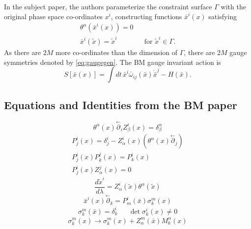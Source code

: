 \documentclass[a4paper,12pt]{article}
\theoremstyle{definition}
\theoremstyle{remark}
\numberwithin{equation}{section}
\newcommand{\al}{\alpha}
\newcommand{\be}{\beta}
\newcommand{\de}{\delta}
\newcommand{\la}{\lambda}
\newcommand{\om}{\omega}
\newcommand{\si}{\sigma}
\newcommand{\To}{\longrightarrow}
\newcommand{\bx}{\bar{x}}
\newcommand{\tx}{\tilde{x}}
\newcommand{\pl}{\overset{\leftarrow}{\partial}}
\begin{document}
In the subject paper, the authors parameterize the constraint
surface $\Gamma$ with the original phase space co-ordinates $x^i$,
constructing functions $\bx^i(x)$ satisfying
\begin{eqnarray}\label{eq:xbar1}
\theta^{\al}(\bx^i(x))=0\label{eq:map1}\\\label{eq:xbar2}
\bx^i(\tx)=\tx^i \label{eq:map2} && \text{for } \tx^i \in \Gamma.
\end{eqnarray}
As there are $2M$ more co-ordinates than the dimension of $\Gamma$,
there are $2M$ gauge symmetries denoted by \eqref{eq:gaugegen}. The
BM gauge invariant action is
\begin{equation}\label{eq:BMaction}
S[\bx(x)]=\int{dt\, \bx^i \bar{\om}_{ij}(\bx) \dot{\bx}^j -
H(\bx)}.
\end{equation}

\subsection{Equations and Identities from the BM paper}
\label{sec:BMidentities}

\begin{equation}\label{eq:Zdef}
\theta^{\al}(x)\pl_i Z^i_{\be}(x)=\delta^{\al}_{\be}
\end{equation}
\begin{eqnarray}
P^i_j(x)=\de^i_j-Z^i_{\al}(x)(\theta^{\al}(x)\pl_j)\label{eq:P}\\
P^i_j(x)P^j_k(x)=P^i_k(x)\\
P^i_j(x)Z^j_{\al}(x)=0 \label{eq:PZ}
\end{eqnarray}
\begin{equation}\label{eq:xtilda}
\frac{d\tx^i}{d\la}=Z^i_{\al}(\tx)\theta^{\al}(\tx)
\end{equation}
\begin{equation}\label{eq:dxbar}
\bx^i(x)\pl_k=P^i_m(\bx)\sigma^m_k(x)
\end{equation}
\begin{eqnarray}
\si^m_k(\bx)=\de^i_k && \det \si^i_k(x)\neq 0
\end{eqnarray}
\begin{equation}\label{eq:si_ambiguity}
\si^m_k(x) \To \si^m_k(x)+Z^m_\al(\bx)M^\al_k(x)
\end{equation}
\end{document}
